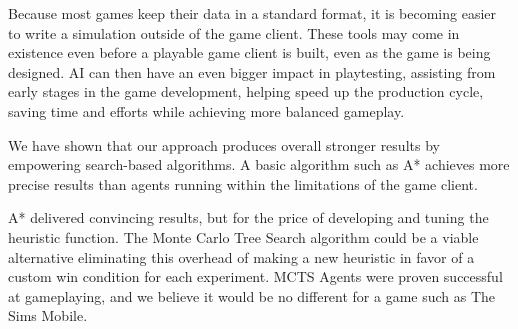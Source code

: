 \documentclass[letterpaper]{article} %
\begin{document}
Because most games keep their data in a standard format, it is becoming easier to write a simulation outside of the game client. These tools may come in existence even before a playable game client is built, even as the game is being designed. AI can then have an even bigger impact in playtesting, assisting from early stages in the game development, helping speed up the production cycle, saving time and efforts while achieving more balanced gameplay.
% 
% 

We have shown that our approach produces overall stronger results by empowering search-based algorithms. A basic algorithm such as A* achieves more precise results than agents running within the limitations of the game client.

A* delivered convincing results, but for the price of developing and tuning the heuristic function. The Monte Carlo Tree Search algorithm could be a viable alternative eliminating this overhead of making a new heuristic in favor of a custom win condition for each experiment. MCTS Agents were proven successful at gameplaying, and we believe it would be no different for a game such as The Sims Mobile.



\end{document}

